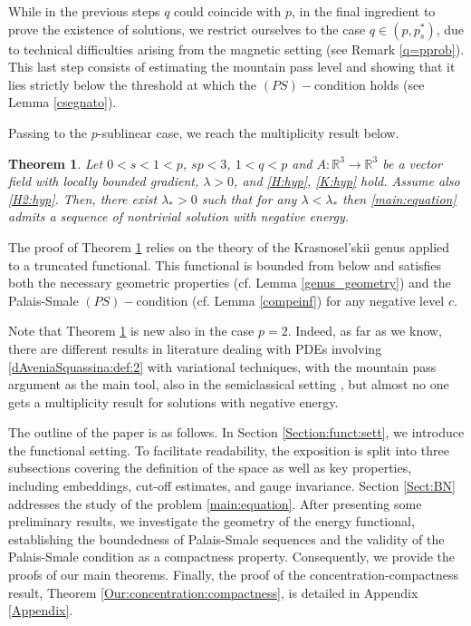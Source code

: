 \documentclass[leqno,11pt]{amsart}
\newcommand{\R}{\mathbb R}
\numberwithin{equation}{section}
\newtheorem{theorem}{Theorem}[section]
\begin{document}
While in the previous steps $q$ could coincide with $p$, in the final ingredient to prove the existence of solutions, we restrict ourselves to the case $q \in (p, p_s^*)$, due to technical difficulties arising from the magnetic setting (see Remark \ref{q=pprob}). This last step consists of estimating the mountain pass level and showing that it lies strictly below the threshold at which the $(PS)-$condition holds (see Lemma \ref{csegnato}).



Passing to the $p$-sublinear case, we reach the multiplicity result below.


\begin{theorem}\label{main:theorem:q<p}
Let $0<s<1<p$, $sp<3$, $1<q<p$ and $A:\R^3 \to \R^3$ be a vector field with locally bounded gradient, $\lambda>0$, and \eqref{H:hyp}, \eqref{K:hyp} hold.  Assume also \eqref{H2:hyp}.
Then, there exist $\lambda_*>0$ such that for any $\lambda<\lambda_*$ then \eqref{main:equation} admits a sequence of nontrivial solution with negative energy.
\end{theorem}



The proof of Theorem \ref{main:theorem:q<p} relies on the theory of the Krasnosel’skii genus applied to a truncated functional. This functional is bounded from below and satisfies both the necessary geometric properties (cf. Lemma \ref{genus_geometry}) and the Palais-Smale $(PS)-$condition (cf. Lemma \ref{compeinf}) for any negative level $c$.





Note that Theorem \ref{main:theorem:q<p} is new also in the case $p=2$. Indeed, as far as we know, there are different results in literature dealing with PDEs involving \eqref{dAveniaSquassina:def:2} with variational techniques, with the mountain pass argument as the main tool, also in the semiclassical setting \cite{Ambrosio_schrodinger, Ambrosio_kirchhoff}, but almost no one gets a multiplicity result for solutions with negative energy. 




The outline of the paper is as follows. In Section \ref{Section:funct:sett}, we introduce the functional setting. To facilitate readability, the exposition is split into three subsections covering the definition of the space as well as key properties, including embeddings, cut-off estimates, and gauge invariance. Section \ref{Sect:BN} addresses the study of the problem \eqref{main:equation}. After presenting some preliminary results, we investigate the geometry of the energy functional, establishing the boundedness of Palais-Smale sequences and the validity of the Palais-Smale condition as a compactness property. Consequently, we provide the proofs of our main theorems. Finally, the proof of the concentration-compactness result, Theorem \ref{Our:concentration:compactness}, is detailed in Appendix \ref{Appendix}.
\end{document}

